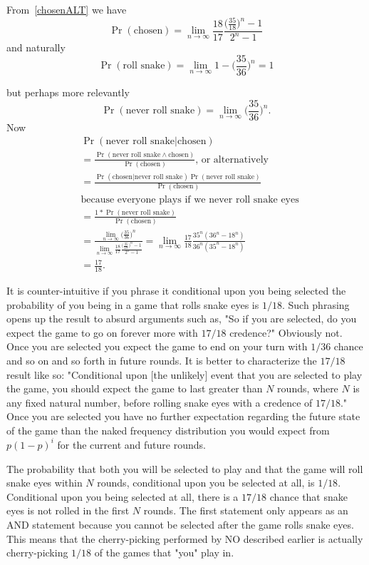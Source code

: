 \documentclass[article,twocolumn]{memoir}
\newcommand{\mycomment}[1]{}
\begin{document}
From~\eqref{chosenALT} we have
$$\Pr(\text{chosen})= \lim_{n\to\infty}\frac{18}{17}\frac{\big(\frac{35}{18}\big)^n-1}{2^n-1}$$
and naturally
$$\Pr(\text{roll snake})=\underset{n\to\infty}{\lim}1-\bigg(\frac{35}{36}\bigg)^n=1$$
\mycomment{$0<\bigg|\Pr(\text{roll snake)}-1\bigg|<\epsilon\text{,   }\forall\text{   } n>\frac{\ln{\epsilon}}{\ln{35}-\ln{36}}$}
but perhaps more relevantly
$$\Pr(\text{never roll snake})=\lim_{n\to\infty}\bigg(\frac{35}{36}\bigg)^n.$$
Now
\begin{align*}
&\Pr(\text{never roll snake|chosen})\\
&=\frac{\Pr(\text{never roll snake}\land\text{chosen})}{\Pr(\text{chosen})}\text{, or alternatively}\\
&=\frac{\Pr(\text{chosen|never roll snake})\Pr(\text{never roll snake})}{\Pr(\text{chosen})}\\
&\text{because everyone plays if we never roll snake eyes}\\
&=\frac{1 * \Pr(\text{never roll snake})}{\Pr(\text{chosen})}\\
&=\frac{\lim_{n\to\infty}\bigg(\frac{35}{36}\bigg)^n}{\lim_{n\to\infty}\frac{18}{17}\frac{\big(\frac{35}{18}\big)^n-1}{2^n-1}} = \lim_{n\to\infty}\frac{17}{18}\frac{35^n(36^n-18^n)}{36^n(35^n-18^n)}\\
&=\frac{17}{18}.
\end{align*}

It is counter-intuitive if you phrase it conditional upon you being selected the probability of you being in a game that rolls snake eyes is $1/18$.
Such phrasing opens up the result to absurd arguments such as, 
"So if you are selected, do you expect the game to go on forever more with $17/18$ credence?"
Obviously not. 
Once you are selected you expect the game to end on your turn with $1/36$ chance and so on and so forth in future rounds.
It is better to characterize the $17/18$ result like so:
"Conditional upon [the unlikely] event that you are selected to play the game, you should expect the game to last greater than $N$ rounds, where $N$ is any fixed natural number, before rolling snake eyes with a credence of $17/18$."
Once you are selected you have no further expectation regarding the future state of the game than the naked frequency distribution you would expect from $p(1-p)^i$ for the current and future rounds.

The probability that both you will be selected to play and that the game will roll snake eyes within $N$ rounds, conditional upon you be selected at all, is $1/18$.
Conditional upon you being selected at all, there is a $17/18$ chance that snake eyes is not rolled in the first $N$ rounds.
The first statement only appears as an AND statement because you cannot be selected after the game rolls snake eyes.
This means that the cherry-picking performed by NO described earlier is actually cherry-picking $1/18$ of the games that "you" play in.
\end{document}
